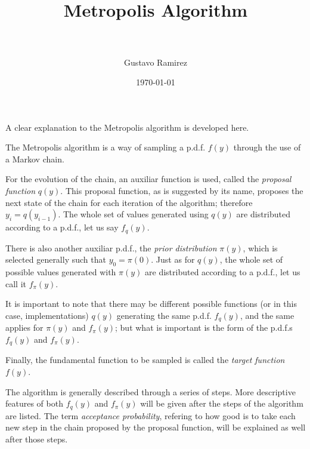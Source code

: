 \documentclass[paper=a4, fontsize=11pt]{scrartcl} %
\title{	
\normalfont \normalsize 
\horrule{0.5pt} \\[0.4cm] %
\huge Metropolis Algorithm \\ %
\horrule{2pt} \\[0.5cm] %
}
\author{Gustavo Ramirez} %
\date{\normalsize\today} %
\numberwithin{equation}{section} %
\numberwithin{figure}{section} %
\numberwithin{table}{section} %
\begin{document}
\maketitle %




A clear explanation to the Metropolis algorithm is developed here.




\newpage




The Metropolis algorithm is a way of sampling a p.d.f. $f(y)$ through the use of a Markov chain.

For the evolution of the chain, an auxiliar function is used, called the \textit{proposal function} $q(y)$. This proposal function, as is suggested by its name, proposes the next state of the chain for each iteration of the algorithm; therefore $y_{i} = q(y_{i-1})$. The whole set of values generated using $q(y)$ are distributed according to a p.d.f., let us say $f_{q}(y)$.

There is also another auxiliar p.d.f., the \textit{prior distribution} $\pi(y)$, which is selected generally such that $y_{0} = \pi(0)$. Just as for $q(y)$, the whole set of possible values generated with $\pi(y)$ are distributed according to a p.d.f., let us call it $f_{\pi}(y)$.

It is important to note that there may be different possible functions (or in this case, implementations) $q(y)$ generating the same p.d.f. $f_{q}(y)$, and the same applies for $\pi(y)$ and $f_{\pi}(y)$; but what is important is the form of the p.d.f.s $f_{q}(y)$ and $f_{\pi}(y)$.

Finally, the fundamental function to be sampled is called the \textit{target function} $f(y)$.

The algorithm is generally described through a series of steps. More descriptive features of both $f_{q}(y)$ and $f_{\pi}(y)$ will be given after the steps of the algorithm are listed. The term \textit{acceptance probability}, refering to how good is to take each new step in the chain proposed by the proposal function, will be explained as well after those steps.
\end{document}
